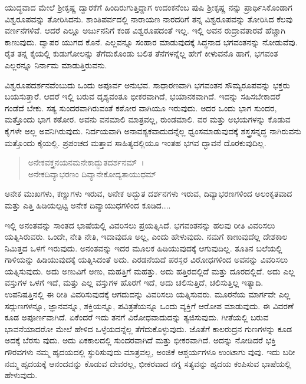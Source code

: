ಯುದ್ಧವಾದ ಮೇಲೆ ಶ‍್ರೀಕೃಷ್ಣ ದ್ವಾರಕೆಗೆ ಹಿಂದಿರುಗುತ್ತಿದ್ದಾಗ ಉದಂಕನೆಂಬ ಪುಷಿ ಶ‍್ರೀಕೃಷ್ಣ ನನ್ನು ಪ್ರಾರ್ಥಿಸಿಕೊಂಡಾಗ ವಿಶ್ವರೂಪವನ್ನು ತೋರಿಸಿದನು. ಶಾಂತಿಪರ್ವದಲ್ಲಿ ನಾರಾಯಣ ನಾರದರಿಗೆ ತನ್ನ ವಿಶ್ವರೂಪವನ್ನು ತೋರಿಸಿದ ಕೆಲವು ವರ್ಣನೆಗಳಿವೆ. ಆದರೆ ಎಲ್ಲೂ ಅರ್ಜುನನಿಗೆ ಕಂಡ ವಿಶ್ವರೂಪದಂತೆ ಇಲ್ಲ. ಇಲ್ಲಿ ಅವನ ರುದ್ರಾವತಾರವೆ ಹೆಚ್ಚಾಗಿ ಕಾಣುವುದು. ದ್ವಾಪರ ಯುಗದ ಕೊನೆ. ಎಲ್ಲವನ್ನೂ ಸಂಹಾರ ಮಾಡುವುದಕ್ಕೆ ಸಿದ್ಧನಾದ ಭಗವಂತನನ್ನು ನೋಡುವೆವು. ರೈತ ತನ್ನ ಕೈಯಲ್ಲಿ ಕುಡುಗೋಲನ್ನು ತೆಗೆದುಕೊಂಡು ಬಲಿತ ತೆನೆಗಳನ್ನೆಲ್ಲ ಹೇಗೆ ಕೀಳುವನೊ ಹಾಗೆ, ಭಗವಂತ ಎಲ್ಲರನ್ನೂ ನಿರ್ನಾಮ ಮಾಡುತ್ತಿರುವನು.

ವಿಶ್ವರೂಪದರ್ಶನವೆಂಬುದು ಒಂದು ಅಪೂರ್ವ ಅನುಭವ. ಸಾಧಾರಣವಾಗಿ ಭಗವಂತನ ಸೌಮ್ಯರೂಪವನ್ನು ಭಕ್ತರು ಬಯಸುತ್ತಾರೆ. ಆದರೆ ಇಲ್ಲಿ ಬರುವ ದೃಶ್ಯವಂತೂ ಭೀಕರವಾಗಿದೆ, ಭಯಾನಕವಾಗಿದೆ. ಇದನ್ನು ಸಹಿಸಬೇಕಾದರೆ ಗಂಡೆದೆ ಬೇಕು. ಸತ್ಯ ಸುಂದರವಾಗಿರುವಂತೆ ಕಠೋರ ವಾಗಿಯೂ ಇರುವುದು. ಅದರ ಒಂದು ಭಾಗ ಸುಂದರ, ಮತ್ತೊಂದು ಭಾಗ ಕಠೋರ. ಅವನು ವನಮಾಲಿ ಮಾತ್ರವಲ್ಲ, ರುಂಡಮಾಲಿ. ವರ ಮತ್ತು ಅಭಯಗಳನ್ನು ಕೊಡುವ ಕೈಗಳೇ ಅಲ್ಲ ಅವನಿಗಿರುವುದು. ನಿರ್ದಯವಾಗಿ ಅನಾವಶ್ಯಕವಾದುದನ್ನೆಲ್ಲ ಧ್ವಂಸಮಾಡುವುದಕ್ಕೆ ಶಸ್ತ್ರಸನ್ನದ್ಧ ನಾಗಿರುವನು ಮತ್ತೊಂದು ಕೈಯಲ್ಲಿ. ಪ್ರಪಂಚದ ಮತ್ತಾವ ಸಾಹಿತ್ಯದಲ್ಲಿಯೂ ಇಂತಹ ಭಗವ ದ್ಭಾವನೆ ದೊರಕುವುದಿಲ್ಲ.

\begin{verse}
ಅನೇಕವಕ್ತ್ರನಯನಮನೇಕಾದ್ಭುತದರ್ಶನಮ್~।\\ಅನೇಕದಿವ್ಯಾಭರಣಂ ದಿವ್ಯಾನೇಕೋದ್ಯತಾಯುಧಮ್ 
\end{verse}

{\small ಅನೇಕ ಮುಖಗಳು, ಕಣ್ಣುಗಳು ಇರುವ, ಅನೇಕ ಅದ್ಭುತ ದರ್ಶನಗಳು ಇರುವ, ದಿವ್ಯಾಭರಣಗಳಿಂದ ಅಲಂಕೃತವಾದ ಮತ್ತು ಎತ್ತಿ ಹಿಡಿಯಲ್ಪಟ್ಟ ಅನೇಕ ದಿವ್ಯಾಯುಧಗಳಿಂದ ಕೂಡಿದ....}

ಇಲ್ಲಿ ಅನಂತವನ್ನು ಸಾಂತದ ಭಾಷೆಯಲ್ಲಿ ವಿವರಿಸಲು ಪ್ರಯತ್ನಿಸಿದೆ. ಭಗವಂತನನ್ನು ಹಲವು ರೀತಿ ವಿವರಿಸಲು ಯತ್ನಿಸಿರುವರು. ಒಂದೇ, ನೇತಿ ನೇತಿ, ಇದಾವುದೂ ಅಲ್ಲ, ಎಂದು ಹೇಳುವುದು. ನಮಗೆ ಕಾಣುವುದೆಲ್ಲ ದೇಶಕಾಲ ನಿಮಿತ್ತದ ಒಳಗೆ ಇರುವುದು. ಅನಂತವನ್ನು ಇದರ ಮೂಲಕ ಹಿಡಿಯುವುದಕ್ಕೆ ಆಗುವುದಿಲ್ಲ. ತೂತಿನ ಬಲೆಯಲ್ಲಿ ಗಾಳಿಯನ್ನು ಹಿಡಿಯುವುದಕ್ಕೆ ಯತ್ನಿಸಿದಂತೆ ಅದು. ಎರಡನೆಯದೆ ಪರಸ್ಪರ ವಿರೋಧಗಳಿಂದ ಅವನನ್ನು ವಿವರಿಸಲು ಯತ್ನಿಸುವುದು. ಅದು ಅಣುವಿಗೆ ಅಣು, ಮಹತ್ತಿಗೆ ಮಹತ್ತು. ಅದು ಹತ್ತಿರದಲ್ಲಿದೆ ಮತ್ತು ದೂರದಲ್ಲಿದೆ. ಅದು ಎಲ್ಲ ವಸ್ತುಗಳ ಒಳಗೆ ಇದೆ, ಮತ್ತು ಎಲ್ಲ ವಸ್ತುಗಳ ಹೊರಗೆ ಇದೆ, ಅದು ಚಲಿಸುತ್ತಿದೆ, ಚಲಿಸುತ್ತಿಲ್ಲ ಇತ್ಯಾದಿ. ಉಪನಿಷತ್ತಿನಲ್ಲಿ ಈ ರೀತಿ ವಿವರಿಸುವುದಕ್ಕೆ ಆಗದುದನ್ನು ವಿವರಿಸಲು ಯತ್ನಿಸುವರು. ಮೂರನೆಯ ಮಾರ್ಗವೇ ಎಲ್ಲ ಸದ್ಗುಣಗಳನ್ನೂ, ಜ್ಞಾನವನ್ನೂ, ಶಕ್ತಿಯನ್ನೂ, ಪವಿತ್ರತೆಯನ್ನೂ ಒಂದು ವ್ಯಕ್ತಿಗೆ ಆರೋಪ ಮಾಡುವುದು. ಈ ವಿವರಣೆ ಕೂಡ ಅಪೂರ್ಣವಾಗಿದೆ. ಏಕೆಂದರೆ ಇದು ತನಗೆ ವಿರೋಧವಾದುದನ್ನು ತ್ಯಜಿಸುವುದು. ಗೀತೆಯಲ್ಲಿ ಬರುವ ಭಾವನೆಯಾದರೋ ಮೇಲೆ ಹೇಳಿದ ಒಳ್ಳೆಯದನ್ನೆಲ್ಲ ತೆಗೆದುಕೊಳ್ಳುವುದು. ಜೊತೆಗೆ ಕಾಲರುದ್ರನ ಗುಣಗಳನ್ನು ಕೂಡ ಅದಕ್ಕೆ ಬೆರಸು ವುದು. ಅದು ಏಕಕಾಲದಲ್ಲಿ ಸುಂದರವಾಗಿದೆ ಮತ್ತು ಭೀಕರವಾಗಿದೆ. ಅದನ್ನು ನೋಡಿದರೆ ಭಕ್ತಿ ಗೌರವಗಳು ನಮ್ಮ ಹೃದಯದಲ್ಲಿ ಸ್ಫುರಿಸುವುದು ಮಾತ್ರವಲ್ಲ, ಅಂಜಿಕೆ ಆಶ್ಚರ್ಯಗಳೂ ಉಂಟಾಗು ವುವು. ಇದು ಬರೀ ನಮ್ಮ ಹೃದಯಕ್ಕೆ ಆನಂದವನ್ನು ಕೊಡುವ ದೇವರಲ್ಲ, ಭೀಕರವಾದ ನಗ್ನ ಸತ್ಯವನ್ನು ಹೃದಯ ಕಂಪಿಸುವ ಭಾಷೆಯಲ್ಲಿ ಹೇಳುವುದು.

